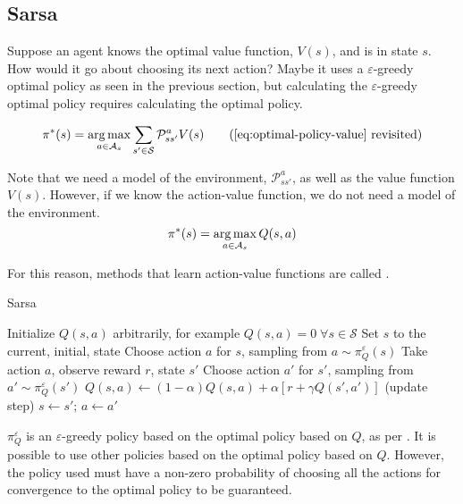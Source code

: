\citep[Section~2.2]{sutton1998introduction}

\subsection{Sarsa\label{subsec:sarsa}}

Suppose an agent knows the optimal value function, $V(s)$, and is in state $s$.
How would it go about choosing its next action? Maybe it uses a
$\varepsilon$-greedy optimal policy as seen in the previous section, but
calculating the $\varepsilon$-greedy optimal policy requires calculating the
optimal policy.

\begin{equation}
  \pi^*(s) = \argmax_{a\in\mathcal{A}_s} \sum_{s'\in\mathcal{S}}\mathcal{P}^a_{ss'}V(s)
  \tag{\ref{eq:optimal-policy-value} revisited}
\end{equation}

Note that we need a model of the environment, $\mathcal{P}^a_{ss'}$, as well as the
value function $V(s)$. However, if we know the action-value function, we do not
need a model of the environment.
\begin{equation}
  \pi^*(s) = \argmax_{a\in\mathcal{A}_s} Q(s, a)
  \label{eq:q-policy}
\end{equation}

For this reason, methods that learn action-value functions are called
 \citep[Subsection~21.3.2]{russell2009aima}.

\begin{algorithm}[h]
\caption{Sarsa \citep[Section~6.4]{sutton1998introduction}}
\label{alg:sarsa}
\begin{algorithmic}
\State Initialize $Q(s, a)$ arbitrarily, for example $Q(s, a)=0 \; \forall
s\in\mathcal{S}$
  \State Set $s$ to the current, initial, state
  \State Choose action $a$ for $s$, sampling from $a \sim \pi^\varepsilon_Q(s)$
    \State Take action $a$, observe reward $r$, state $s'$
    \State Choose action $a'$ for $s'$, sampling from $a' \sim \pi^\varepsilon_Q(s')$
    \State $Q(s, a) \gets (1-\alpha)Q(s,a) +
      \alpha \left[r + \gamma Q(s', a') \right]$ (update step)
    \State $s \gets s'$; $a \gets a'$
\EndRepeatComment
\end{algorithmic}
\end{algorithm}

$\pi^\varepsilon_Q$ is an $\varepsilon$-greedy policy based on
the optimal policy based on $Q$, as per . It is
possible to use other policies based on the optimal policy based on $Q$. However,
the policy used must have a non-zero probability of choosing all the actions for
convergence to the optimal policy to be guaranteed.

